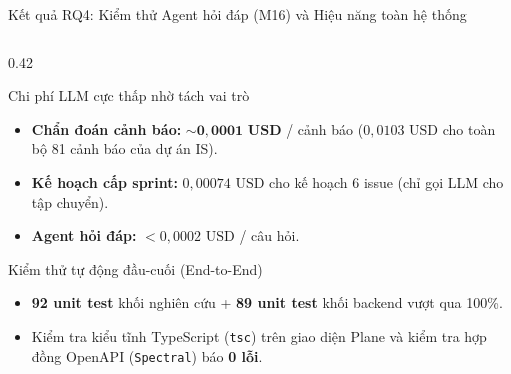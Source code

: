 \begin{frame}{Kết quả RQ4: Kiểm thử Agent hỏi đáp (M16) và Hiệu năng toàn hệ thống}
\begin{columns}[T,onlytextwidth]
\begin{column}{0.42\textwidth}
\begin{block}{Chi phí LLM cực thấp nhờ tách vai trò}
        \begin{itemize}
          \setlength{\itemsep}{1.5pt}
          \item \textbf{Chẩn đoán cảnh báo:} $\sim \mathbf{0{,}0001\text{ USD}}$ / cảnh báo ($0{,}0103\text{ USD}$ cho toàn bộ 81 cảnh báo của dự án IS).
          \item \textbf{Kế hoạch cấp sprint:} $0{,}00074\text{ USD}$ cho kế hoạch 6 issue (chỉ gọi LLM cho tập chuyển).
          \item \textbf{Agent hỏi đáp:} $< 0{,}0002\text{ USD}$ / câu hỏi.
        \end{itemize}
      \end{block}
      \vspace{0.05cm}
      \begin{alertblock}{Kiểm thử tự động đầu-cuối (End-to-End)}
        \begin{itemize}
          \setlength{\itemsep}{1.5pt}
          \item \textbf{92 unit test} khối nghiên cứu + \textbf{89 unit test} khối backend vượt qua 100\%.
          \item Kiểm tra kiểu tĩnh TypeScript (\texttt{tsc}) trên giao diện Plane và kiểm tra hợp đồng OpenAPI (\texttt{Spectral}) báo \textbf{0 lỗi}.
        \end{itemize}
      \end{alertblock}
    \end{column}
  \end{columns}
\end{frame}
